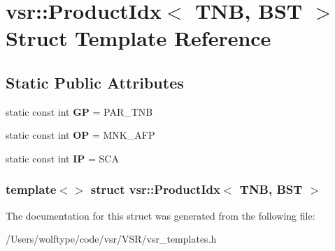 \hypertarget{structvsr_1_1_product_idx_3_01_t_n_b_00_01_b_s_t_01_4}{\section{vsr\-:\-:Product\-Idx$<$ T\-N\-B, B\-S\-T $>$ Struct Template Reference}
\label{structvsr_1_1_product_idx_3_01_t_n_b_00_01_b_s_t_01_4}
}
\subsection*{Static Public Attributes}
\begin{DoxyCompactItemize}
\item 
\hypertarget{structvsr_1_1_product_idx_3_01_t_n_b_00_01_b_s_t_01_4_a3d6e6e9a04327842af28b250c64cacac}{static const int {\bfseries G\-P} = P\-A\-R\-\_\-\-T\-N\-B}\label{structvsr_1_1_product_idx_3_01_t_n_b_00_01_b_s_t_01_4_a3d6e6e9a04327842af28b250c64cacac}

\item 
\hypertarget{structvsr_1_1_product_idx_3_01_t_n_b_00_01_b_s_t_01_4_a3a8854b4364a1d1ac84d3484f5f752c1}{static const int {\bfseries O\-P} = M\-N\-K\-\_\-\-A\-F\-P}\label{structvsr_1_1_product_idx_3_01_t_n_b_00_01_b_s_t_01_4_a3a8854b4364a1d1ac84d3484f5f752c1}

\item 
\hypertarget{structvsr_1_1_product_idx_3_01_t_n_b_00_01_b_s_t_01_4_a27a8d1c33ef44f8ab9e17c9da7aed50b}{static const int {\bfseries I\-P} = S\-C\-A}\label{structvsr_1_1_product_idx_3_01_t_n_b_00_01_b_s_t_01_4_a27a8d1c33ef44f8ab9e17c9da7aed50b}

\end{DoxyCompactItemize}
\subsubsection*{template$<$$>$ struct vsr\-::\-Product\-Idx$<$ T\-N\-B, B\-S\-T $>$}



The documentation for this struct was generated from the following file\-:\begin{DoxyCompactItemize}
\item 
/\-Users/wolftype/code/vsr/\-V\-S\-R/vsr\-\_\-templates.\-h\end{DoxyCompactItemize}

